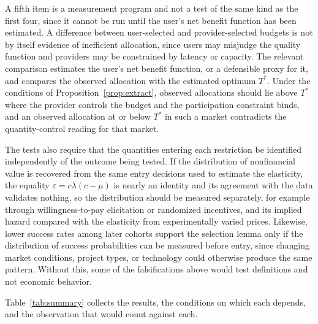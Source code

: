 \documentclass[11pt]{article}
\theoremstyle{remark}
\begin{document}
A fifth item is a measurement program and not a test of the same kind as the first four, since it cannot be run until the user's net benefit function has been estimated. A difference between user-selected and provider-selected budgets is not by itself evidence of inefficient allocation, since users may misjudge the quality function and providers may be constrained by latency or capacity. The relevant comparison estimates the user's net benefit function, or a defensible proxy for it, and compares the observed allocation with the estimated optimum $T^{*}$. Under the conditions of Proposition~\ref{prop:extract}, observed allocations should lie above $T^{*}$ where the provider controls the budget and the participation constraint binds, and an observed allocation at or below $T^{*}$ in such a market contradicts the quantity-control reading for that market.

The tests also require that the quantities entering each restriction be identified independently of the outcome being tested. If the distribution of nonfinancial value is recovered from the same entry decisions used to estimate the elasticity, the equality $\varepsilon=c\lambda(c-\mu)$ is nearly an identity and its agreement with the data validates nothing, so the distribution should be measured separately, for example through willingness-to-pay elicitation or randomized incentives, and its implied hazard compared with the elasticity from experimentally varied prices. Likewise, lower success rates among later cohorts support the selection lemma only if the distribution of success probabilities can be measured before entry, since changing market conditions, project types, or technology could otherwise produce the same pattern. Without this, some of the falsifications above would test definitions and not economic behavior.

Table~\ref{tab:summary} collects the results, the conditions on which each depends, and the observation that would count against each.
\end{document}
